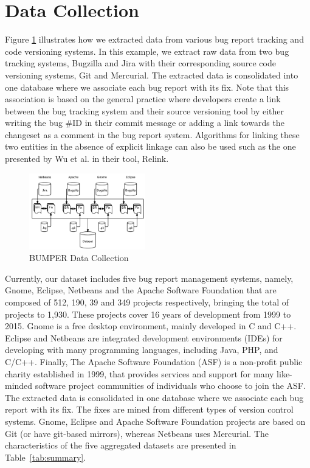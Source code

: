 \documentclass{sig-alternate-05-2015}
\begin{document}
\section{Data Collection}
\label{sec:Data Collection}

Figure \ref{fig:bumper-dc} illustrates how we extracted
data from various bug report tracking and code
versioning systems. In this example, we extract raw data
from two bug tracking systems, Bugzilla and Jira with their
corresponding source code versioning systems, Git and
Mercurial. The extracted data is consolidated into one
database where we associate
each bug report with its fix. Note that this association is
based on the general practice where developers create a link
between the bug tracking system and their source versioning
tool by either writing the bug \#ID in their commit message or
adding a link towards the changeset as a comment in the bug
report system. Algorithms for linking these two entities in
the absence of explicit linkage can also be used such as the
one presented by Wu et al. \cite{Wu2011} in their tool, Relink.


\begin{figure}
  \centering
  \includegraphics[width=0.45\textwidth]{media/dc.png}
  \caption{BUMPER Data Collection\label{fig:bumper-dc}}
\end{figure}


Currently, our dataset includes five bug report management systems, namely, Gnome, Eclipse, Netbeans and the Apache Software Foundation that are composed
of 512, 190, 39 and 349 projects respectively,
bringing the total of projects to 1,930.
These projects cover 16 years of development from 1999 to 2015.
Gnome is a free desktop environment, mainly developed in C and C++.
Eclipse and Netbeans are integrated development environments (IDEs) for
developing with many programming languages, including Java, PHP, and C/C++.
Finally, The Apache Software Foundation (ASF) is a non-profit public charity
established in 1999, that provides services and support for many like-minded
software project communities of individuals who choose to join the ASF.
The extracted data is consolidated in one database where we associate each bug report with its fix.
The fixes are mined from different types of version control systems.
Gnome, Eclipse and Apache Software Foundation projects are based on Git
 (or have git-based mirrors), whereas Netbeans uses Mercurial.
The characteristics of the five aggregated datasets
are presented in Table~\ref{tab:summary}.
\end{document}
